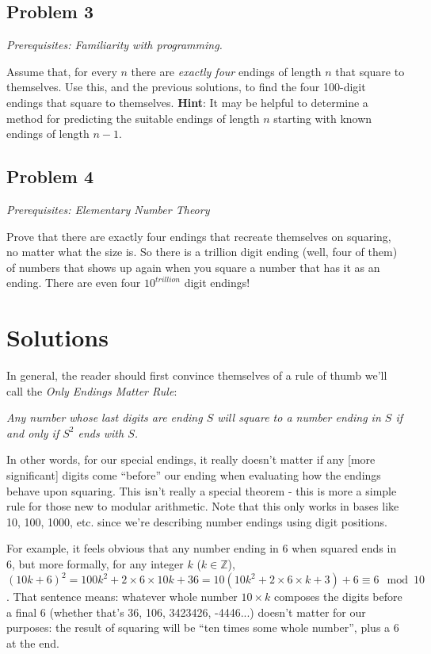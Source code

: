\documentclass[11pt, oneside]{article} 	%
\begin{document}
\subsection{Problem 3} 

\emph{Prerequisites: Familiarity with programming.}

Assume that, for every $n$ there are \emph{exactly four} endings of length $n$ that square to themselves.  Use this, and the previous solutions, to find the four 100-digit endings that square to themselves.  \textbf{Hint}: It may be helpful to determine a method for predicting the suitable endings of length $n$ starting with known endings of length $n-1$.

\subsection{Problem 4}

\emph{Prerequisites: Elementary Number Theory}

Prove that there are exactly four endings that recreate themselves on squaring, no matter what the size is.  So there is a trillion digit ending (well, four of them) of numbers that shows up again when you square a number that has it as an ending.  There are even four $10^{trillion}$ digit endings!  


\section{Solutions}

In general, the reader should first convince themselves of a rule of thumb we'll call the \emph{Only Endings Matter Rule}:

\emph{Any number whose last digits are ending $S$ will square to a number ending in $S$ if and only if $S^2$ ends with $S$.}



 In other words, for our special endings, it really doesn't matter if any [more significant] digits come ``before'' our ending when evaluating how the endings behave upon squaring.   This isn't really a special theorem - this is more a simple rule for those new to modular arithmetic.  Note that this only works in bases like 10, 100, 1000, etc. since we're describing number endings using digit positions.

For example, it feels obvious that any number ending in 6 when squared ends in 6, but more formally, for any integer $k$ ($k \in \mathbb{Z}$), $(10k + 6)^2 = 100k^2 + 2 \times 6 \times 10k + 36  = 10(10k^2 + 2 \times 6 \times k + 3) + 6 \equiv 6 \mod 10$. That sentence means: whatever whole number $10 \times k$ composes the digits before a final $6$ (whether that's 36, 106, 3423426, -4446...)  doesn't matter for our purposes: the result of squaring will be ``ten times some whole number'', plus a 6 at the end.
\end{document}
